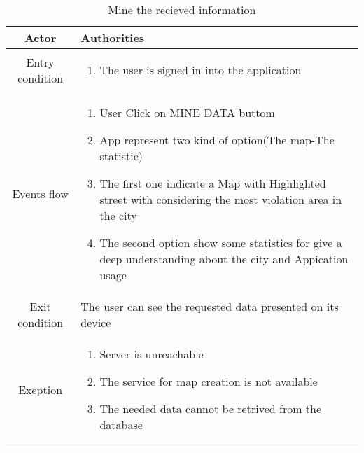 \documentclass{article}
\begin{document}
		\begin{table} [H]
		\begin{center}
		\caption{Mine the recieved information}
		\begin{tabular}{|c|p{8cm}|}
			\hline
			Actor&Authorities\\
			\hline
			Entry condition& \begin{enumerate}
								\item The user is signed in into the application
							\end{enumerate}\\
			\hline
			 Events flow& \begin{enumerate}
							\item User Click on MINE DATA buttom 			
							\item App represent two kind of option(The map-The statistic)
							\item The first one indicate a Map with Highlighted street with considering the most violation area in the city
							\item The second option show some statistics for give a deep understanding about the city and Appication usage
						\end{enumerate}\\
			\hline
			Exit condition& The user can see the requested data presented on its device\\
			\hline
			Exeption& \begin{enumerate}
						\item Server is unreachable
						\item The service for map creation is not available
						\item The needed data cannot be retrived from the database
					\end{enumerate}\\
			\hline
		\end{tabular}
		\end{center}
		\end{table} 
\end{document}
